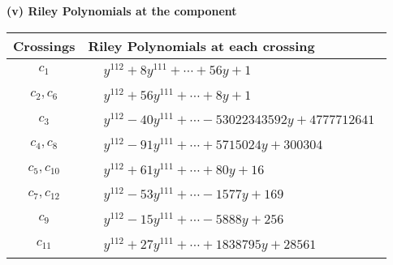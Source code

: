 \documentclass[1p]{elsarticle_modified}
\theoremstyle{definition}
\begin{document}
\newpage\renewcommand{\arraystretch}{1}
\flushleft \textbf{(v) Riley Polynomials at the component}\newline \\
\begin{tabular}{m{50pt}|m{274pt}}
Crossings & \hspace{64pt}Riley Polynomials at each crossing \\
\hline $$\begin{aligned}c_{1}\end{aligned}$$&$\begin{aligned}
&y^{112}+8 y^{111}+\cdots+56 y+1
\end{aligned}$\\
\hline $$\begin{aligned}c_{2},c_{6}\end{aligned}$$&$\begin{aligned}
&y^{112}+56 y^{111}+\cdots+8 y+1
\end{aligned}$\\
\hline $$\begin{aligned}c_{3}\end{aligned}$$&$\begin{aligned}
&y^{112}-40 y^{111}+\cdots-53022343592 y+4777712641
\end{aligned}$\\
\hline $$\begin{aligned}c_{4},c_{8}\end{aligned}$$&$\begin{aligned}
&y^{112}-91 y^{111}+\cdots+5715024 y+300304
\end{aligned}$\\
\hline $$\begin{aligned}c_{5},c_{10}\end{aligned}$$&$\begin{aligned}
&y^{112}+61 y^{111}+\cdots+80 y+16
\end{aligned}$\\
\hline $$\begin{aligned}c_{7},c_{12}\end{aligned}$$&$\begin{aligned}
&y^{112}-53 y^{111}+\cdots-1577 y+169
\end{aligned}$\\
\hline $$\begin{aligned}c_{9}\end{aligned}$$&$\begin{aligned}
&y^{112}-15 y^{111}+\cdots-5888 y+256
\end{aligned}$\\
\hline $$\begin{aligned}c_{11}\end{aligned}$$&$\begin{aligned}
&y^{112}+27 y^{111}+\cdots+1838795 y+28561
\end{aligned}$\\
\hline
\end{tabular}\\~\\
\end{document}

